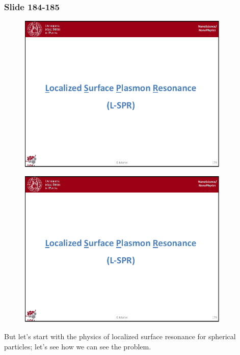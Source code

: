 \documentclass[../main/main.tex]{subfiles}
\begin{document}
\newpage

\subsubsection{Slide 184-185}

\begin{figure}[h!]
\centering
\includegraphics[page=6,width=0.9\textwidth]{../lessons/pdf_file/11_lesson.pdf}
\end{figure}

\begin{figure}[h!]
\centering
\includegraphics[page=7,width=0.9\textwidth]{../lessons/pdf_file/11_lesson.pdf}
\end{figure}

\newpage
But let's start with the physics of localized surface resonance for spherical particles; let's see how we can see the problem. 
\end{document}
